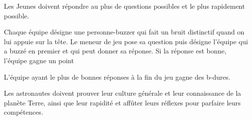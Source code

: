 \documentclass{grand-jeu}
\begin{document}
\begin{liste-materiel}
\end{liste-materiel}

\begin{regles}
Les Jeunes doivent répondre au plus de questions possibles et le plus rapidement possible. 

Chaque équipe désigne une personne-buzzer qui fait un bruit distinctif quand on lui appuie sur la tête.
Le meneur de jeu pose sa question puis désigne l'équipe qui a buzzé en premier et qui peut donner sa réponse. Si la réponse est bonne, l'équipe gagne un point

L'équipe ayant le plus de bonnes réponses à la fin du jeu gagne des b-dures. 
\end{regles}

\begin{imaginaire}
Les astronautes doivent prouver leur culture générale et leur connaissance de la planète Terre, ainsi que leur rapidité et affûter leurs réflexes pour parfaire leurs compétences.
\end{imaginaire}

\begin{moments-stop}
\end{moments-stop}
\end{document}
